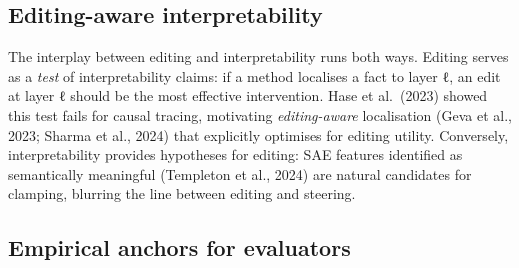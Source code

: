 \subsection{Editing-aware interpretability}\label{editing-aware-interpretability}

The interplay between editing and interpretability runs both ways. Editing serves as a \emph{test} of interpretability claims: if a method localises a fact to layer ℓ, an edit at layer ℓ should be the most effective intervention. Hase et al.~(2023) showed this test fails for causal tracing, motivating \emph{editing-aware} localisation (Geva et al., 2023; Sharma et al., 2024) that explicitly optimises for editing utility. Conversely, interpretability provides hypotheses for editing: SAE features identified as semantically meaningful (Templeton et al., 2024) are natural candidates for clamping, blurring the line between editing and steering.

\subsection{Empirical anchors for evaluators}\label{empirical-anchors-for-evaluators}

